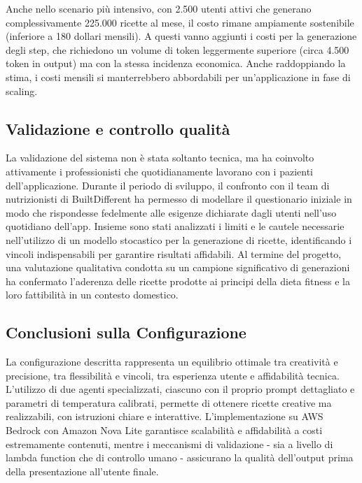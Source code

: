 Anche nello scenario più intensivo, con 2.500 utenti attivi che generano complessivamente 225.000 ricette al mese, il costo rimane ampiamente sostenibile (inferiore a 180 dollari mensili). A questi vanno aggiunti i costi per la generazione degli step, che richiedono un volume di token leggermente superiore (circa 4.500 token in output) ma con la stessa incidenza economica. Anche raddoppiando la stima, i costi mensili si manterrebbero abbordabili per un'applicazione in fase di scaling.

\subsection{Validazione e controllo qualità}

La validazione del sistema non è stata soltanto tecnica, ma ha coinvolto attivamente i professionisti che quotidianamente lavorano con i pazienti dell'applicazione. Durante il periodo di sviluppo, il confronto con il team di nutrizionisti di BuiltDifferent ha permesso di modellare il questionario iniziale in modo che rispondesse fedelmente alle esigenze dichiarate dagli utenti nell'uso quotidiano dell'app. Insieme sono stati analizzati i limiti e le cautele necessarie nell'utilizzo di un modello stocastico per la generazione di ricette, identificando i vincoli indispensabili per garantire risultati affidabili. Al termine del progetto, una valutazione qualitativa condotta su un campione significativo di generazioni ha confermato l'aderenza delle ricette prodotte ai principi della dieta fitness e la loro fattibilità in un contesto domestico.

\subsection{Conclusioni sulla Configurazione}

La configurazione descritta rappresenta un equilibrio ottimale tra creatività e precisione, tra flessibilità e vincoli, tra esperienza utente e affidabilità tecnica. L'utilizzo di due agenti specializzati, ciascuno con il proprio prompt dettagliato e parametri di temperatura calibrati, permette di ottenere ricette creative ma realizzabili, con istruzioni chiare e interattive. L'implementazione su AWS Bedrock con Amazon Nova Lite garantisce scalabilità e affidabilità a costi estremamente contenuti, mentre i meccanismi di validazione - sia a livello di lambda function che di controllo umano - assicurano la qualità dell'output prima della presentazione all'utente finale.